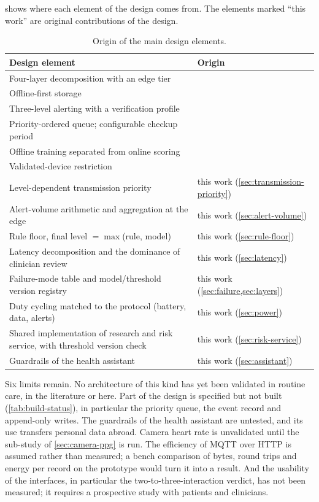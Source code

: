  shows where each element of the design comes from. The elements marked ``this work'' are original contributions of the design.

\begin{table}[htbp]
\centering\footnotesize
\caption{Origin of the main design elements.}\label{tab:traceability}
\begin{tabularx}{\textwidth}{@{}X >{\raggedright\arraybackslash}p{5.2cm}@{}}
\toprule
\textbf{Design element} & \textbf{Origin} \\
\midrule
Four-layer decomposition with an edge tier & \textcite{mucchi2021} \\
Offline-first storage & \textcite{efendi2025} \\
Three-level alerting with a verification profile & \textcite{mihevc2025} \\
Priority-ordered queue; configurable checkup period & \textcite{yazdani2018} \\
Offline training separated from online scoring & \textcite{liu2025review} \\
Validated-device restriction & \textcite{who2023hypertension} \\
Level-dependent transmission priority & this work (\cref{sec:transmission-priority}) \\
Alert-volume arithmetic and aggregation at the edge & this work (\cref{sec:alert-volume}) \\
Rule floor, final level $=\max$(rule, model) & this work (\cref{sec:rule-floor}) \\
Latency decomposition and the dominance of clinician review & this work (\cref{sec:latency}) \\
Failure-mode table and model/threshold version registry & this work (\cref{sec:failure,sec:layers}) \\
Duty cycling matched to the protocol (battery, data, alerts) & this work (\cref{sec:power}) \\
Shared implementation of research and risk service, with threshold version check & this work (\cref{sec:risk-service}) \\
Guardrails of the health assistant & this work (\cref{sec:assistant}) \\
\bottomrule
\end{tabularx}
\end{table}

Six limits remain. No architecture of this kind has yet been validated in routine care, in the literature or here. Part of the design is specified but not built (\cref{tab:build-status}), in particular the priority queue, the event record and append-only writes. The guardrails of the health assistant are untested, and its use transfers personal data abroad. Camera heart rate is unvalidated until the sub-study of \cref{sec:camera-ppg} is run. The efficiency of MQTT over HTTP is assumed rather than measured; a bench comparison of bytes, round trips and energy per record on the prototype would turn it into a result. And the usability of the interfaces, in particular the two-to-three-interaction verdict, has not been measured; it requires a prospective study with patients and clinicians.
